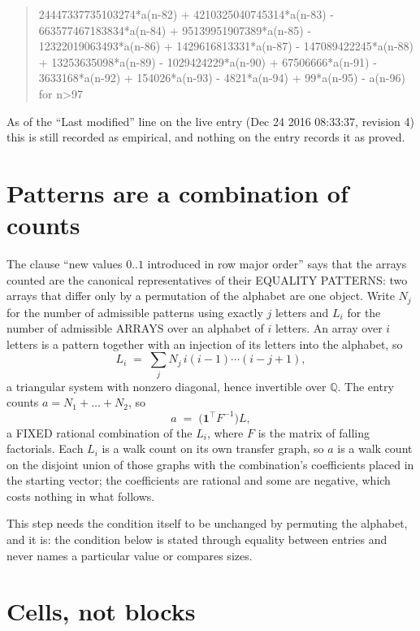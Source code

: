 \documentclass[11pt,a4paper]{article}
\theoremstyle{plain}
\theoremstyle{definition}
\begin{document}
\begin{quote}
24447337735103274*a(n-82) + 4210325040745314*a(n-83) - 663577467183834*a(n-84) + 95139951907389*a(n-85) - 12322019063493*a(n-86) + 1429616813331*a(n-87) - 147089422245*a(n-88) + 13253635098*a(n-89) - 1029424229*a(n-90) + 67506666*a(n-91) - 3633168*a(n-92) + 154026*a(n-93) - 4821*a(n-94) + 99*a(n-95) - a(n-96) for n>97
\end{quote}
As of the ``Last modified'' line on the live entry (Dec 24 2016 08:33:37, revision 4) this is still
recorded as empirical, and nothing on the entry records it as proved.

\section{Patterns are a combination of counts}

The clause ``new values $0..1$ introduced in row major order'' says that the arrays
counted are the canonical representatives of their EQUALITY PATTERNS: two arrays that differ
only by a permutation of the alphabet are one object. Write $N_j$ for the number of admissible
patterns using exactly $j$ letters and $L_i$ for the number of admissible ARRAYS over an
alphabet of $i$ letters. An array over $i$ letters is a pattern together with an injection of
its letters into the alphabet, so
\[
L_i\;=\;\sum_{j}N_j\,i(i-1)\cdots(i-j+1),
\]
a triangular system with nonzero diagonal, hence invertible over $\mathbb{Q}$. The entry
counts $a=N_1+\dots+N_{2}$, so
\[
a\;=\;\bigl(\mathbf{1}^{\!\top}F^{-1}\bigr)L ,
\]
a FIXED rational combination of the $L_i$, where $F$ is the matrix of falling factorials.
Each $L_i$ is a walk count on its own transfer graph, so $a$ is a walk count on the disjoint
union of those graphs with the combination's coefficients placed in the starting vector; the
coefficients are rational and some are negative, which costs nothing in what follows.

This step needs the condition itself to be unchanged by permuting the alphabet, and it is:
the condition below is stated through equality between entries and never names a particular
value or compares sizes.

\section{Cells, not blocks}
\end{document}
